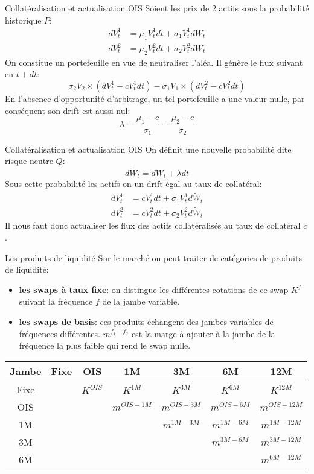 \documentclass{beamer}
\begin{document}
\begin{frame}{Collatéralisation et actualisation OIS}
Soient les prix de 2 actifs sous la probabilité historique $P$:
\[
\begin{split}
dV^1_t&=\mu_1 V^1_t dt + \sigma_1 V^1_t dW_t\\
dV^2_t&=\mu_2 V^2_t dt + \sigma_2 V^2_t dW_t
\end{split}
\]
On constitue un portefeuille en vue de neutraliser l'aléa. Il génère le flux suivant en $t+dt$:
\[
\sigma_2 V_2 \times (dV^1_t - c V^1_t dt)-\sigma_1 V_1 \times (dV^2_t - c V^2_t dt)
\]
En l'absence d'opportunité d'arbitrage, un tel portefeuille a une valeur nulle, par conséquent son drift est aussi nul:
\[
\lambda=\frac{\mu_1-c}{\sigma_1}=\frac{\mu_2-c}{\sigma_2}
\]
\end{frame}

\begin{frame}{Collatéralisation et actualisation OIS}
On définit une nouvelle probabilité dite risque neutre $Q$:\\
\[
d\widetilde{W}_t=dW_t+\lambda dt
\]
Sous cette probabilité les actifs on un drift égal au taux de collatéral:\\
\[
\begin{split}
dV^1_t&=c V^1_t dt + \sigma_1 V^1_t d\widetilde{W}_t\\
dV^2_t&=c V^2_t dt + \sigma_2 V^2_t d\widetilde{W}_t
\end{split}
\]
Il nous faut donc actualiser les flux des actifs collatéralisés au taux de collatéral $c$.

\end{frame}

\begin{frame}{Les produits de liquidité}
Sur le marché on peut traiter de catégories de produits de liquidité:
\begin{itemize}
\item \textbf{les swaps à taux fixe}: on distingue les différentes cotations de ce swap $K^f$ suivant la fréquence $f$ de la jambe variable.\\
\item \textbf{les swaps de basis}: ces produits échangent des jambes variables de fréquences différentes. $m^{f_1-f_2}$ est la marge à ajouter à la jambe de la fréquence la plus faible qui rend le swap nulle.\\ 
\end{itemize}
\small
\begin{center}
\begin{tabular}{|c|c|c|c|c|c|c|}
\hline
Jambe&Fixe&OIS&1M&3M&6M&12M\\
\hline
Fixe&&$K^{OIS}$&$K^{1M}$&$K^{3M}$&$K^{6M}$&$K^{12M}$\\
\hline
OIS&&&$m^{OIS-1M}$&$m^{OIS-3M}$&$m^{OIS-6M}$&$m^{OIS-12M}$\\
1M&&&&$m^{1M-3M}$&$m^{1M-6M}$&$m^{1M-12M}$\\
3M&&&&&$m^{3M-6M}$&$m^{3M-12M}$\\
6M&&&&&&$m^{6M-12M}$\\
\hline
\end{tabular}
\end{center}
\end{frame}
\end{document}
